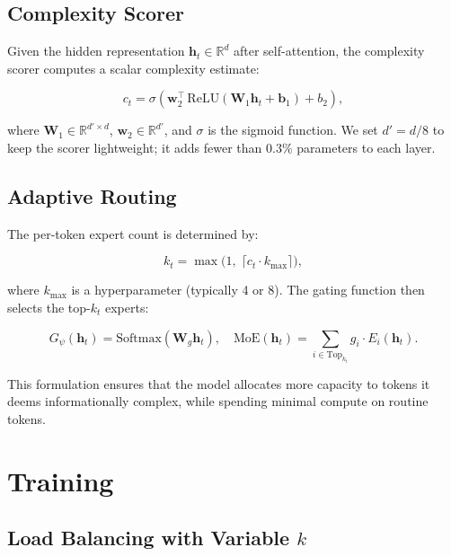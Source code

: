 \documentclass[11pt,a4paper]{article}
\newcommand{\R}{\mathbb{R}}
\begin{document}
\subsection{Complexity Scorer}

Given the hidden representation $\mathbf{h}_t \in \R^d$ after self-attention, the complexity
scorer computes a scalar complexity estimate:

\begin{equation}
\label{eq:complexity}
  c_t = \sigma\!\left(\mathbf{w}_2^\top \, \text{ReLU}(\mathbf{W}_1 \mathbf{h}_t + \mathbf{b}_1) + b_2\right),
\end{equation}

\noindent where $\mathbf{W}_1 \in \R^{d' \times d}$, $\mathbf{w}_2 \in \R^{d'}$, and
$\sigma$ is the sigmoid function.
We set $d' = d/8$ to keep the scorer lightweight; it adds fewer than 0.3\% parameters
to each layer.

\subsection{Adaptive Routing}

The per-token expert count is determined by:

\begin{equation}
\label{eq:adaptive_k}
  k_t = \max\!\big(1,\; \lceil c_t \cdot k_{\max} \rceil\big),
\end{equation}

\noindent where $k_{\max}$ is a hyperparameter (typically 4 or 8).
The gating function then selects the top-$k_t$ experts:

\begin{equation}
\label{eq:gate}
  G_\psi(\mathbf{h}_t) = \text{Softmax}\!\left(\mathbf{W}_g \mathbf{h}_t\right), \quad
  \text{MoE}(\mathbf{h}_t) = \sum_{i \in \text{Top}_{k_t}} g_i \cdot E_i(\mathbf{h}_t).
\end{equation}

This formulation ensures that the model allocates more capacity to tokens it deems
informationally complex, while spending minimal compute on routine tokens.

\section{Training}
\label{sec:training}

\subsection{Load Balancing with Variable $k$}
\end{document}
